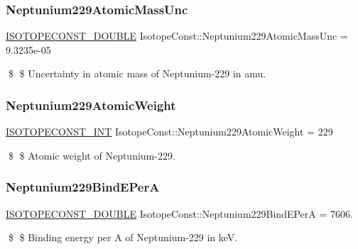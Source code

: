 \subsubsection{\texorpdfstring{Neptunium229\+Atomic\+Mass\+Unc}{Neptunium229AtomicMassUnc}}
{\footnotesize\ttfamily \mbox{\hyperlink{group___isotope_const-_macros_ga8f45a7272ce02c0b4c65c44636ed719a}{I\+S\+O\+T\+O\+P\+E\+C\+O\+N\+S\+T\+\_\+\+D\+O\+U\+B\+LE}} Isotope\+Const\+::\+Neptunium229\+Atomic\+Mass\+Unc = 9.\+3235e-\/05}

\$ \$ Uncertainty in atomic mass of Neptunium-\/229 in amu. \mbox{\label{group___isotope_const-_neptunium-_np229_ga9a00a6984a7fcaf7c418b62226ea9e95}} 
\subsubsection{\texorpdfstring{Neptunium229\+Atomic\+Weight}{Neptunium229AtomicWeight}}
{\footnotesize\ttfamily \mbox{\hyperlink{group___isotope_const-_macros_ga5f18360b3e99483a35c32d789e62621c}{I\+S\+O\+T\+O\+P\+E\+C\+O\+N\+S\+T\+\_\+\+I\+NT}} Isotope\+Const\+::\+Neptunium229\+Atomic\+Weight = 229}

\$ \$ Atomic weight of Neptunium-\/229. \mbox{\label{group___isotope_const-_neptunium-_np229_gaf93a32d6de2721285045d298eda6ccc5}} 
\subsubsection{\texorpdfstring{Neptunium229\+Bind\+E\+PerA}{Neptunium229BindEPerA}}
{\footnotesize\ttfamily \mbox{\hyperlink{group___isotope_const-_macros_ga8f45a7272ce02c0b4c65c44636ed719a}{I\+S\+O\+T\+O\+P\+E\+C\+O\+N\+S\+T\+\_\+\+D\+O\+U\+B\+LE}} Isotope\+Const\+::\+Neptunium229\+Bind\+E\+PerA = 7606.}

\$ \$ Binding energy per A of Neptunium-\/229 in keV. \mbox{\label{group___isotope_const-_neptunium-_np229_ga71c06af75ff229408cb477e2e37b9204}} 
